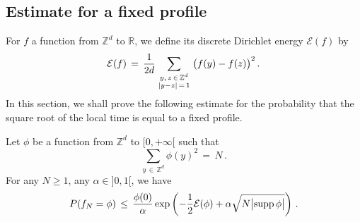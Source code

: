 \documentclass[AHL, Unicode, longabstracts, published]{cedram}
\newcommand{\tatop}[2]{\genfrac{}{}{0pt}{1}{#1}{#2}}
\newcommand*\supp{\text{supp\,}}
\newcommand*\Zd {{\mathbb Z^d}}
\newcommand*\R{\mathbb{R}}
\newcommand{\cE}{\mathcal{E}}
\begin{document}
\subsection{Estimate for a fixed profile}
For $f$ a function from $\Zd$ to $\R$, we define its discrete Dirichlet energy $\cE(f)$ by
\[
\cE(f)\,=\,
\frac{1}{2d}
\sum_{\tatop{y,\,z\,\in\,\Zd}{|y-z|\,=\,1}}
\big(f(y)-f(z)\big)^2\,.
\]
In this section, we shall prove the following estimate for the probability that the square root of the local time is equal to a fixed profile.
\begin{prop}\label{profix}
Let $\phi$ be a function from $\Zd$ to $[0,+\infty[$ such that
\[
\sum_{y\,\in\,\Zd}\phi(y)^2\,=\,N\,.
\]
For any $N\geq 1$, any $\alpha\in]0,1[$, we have
\[
P(f_N=\phi)\,\leq\,
\frac{\phi(0) }{\alpha}
\exp\left(-\frac{1}{2}\cE(\phi) +\alpha
\sqrt{N\big|\supp\phi\big|}
\right)\,.
\]
\end{prop}
\end{document}
